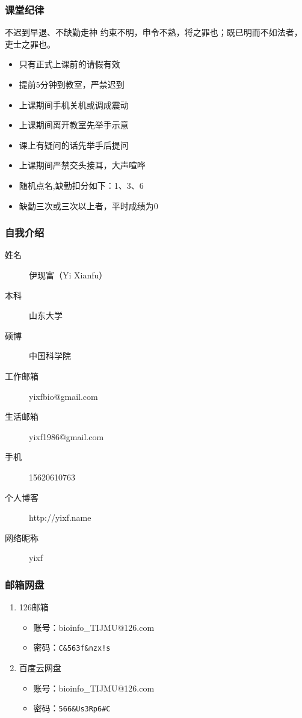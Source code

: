 



\begin{frame}
  \frametitle{课堂纪律}
  \begin{alertblock}{不迟到早退、不缺勤走神}
  约束不明，申令不熟，将之罪也；既已明而不如法者，吏士之罪也。
  \end{alertblock}
  \pause
  \begin{itemize}[<+->]
    \item 只有正式上课前的请假有效
    \item 提前5分钟到教室，严禁迟到
    \item 上课期间手机关机或调成震动
    \item 上课期间离开教室先举手示意
    \item 课上有疑问的话先举手后提问
    \item 上课期间严禁交头接耳，大声喧哗
    \item 随机点名,缺勤扣分如下：1、3、6
    \item 缺勤三次或三次以上者，平时成绩为0
  \end{itemize}
\end{frame}

\begin{frame}
  \frametitle{自我介绍}
    \begin{description}
      \item[姓\qquad 名]伊现富（Yi Xianfu）
      \item[本\qquad 科]山东大学
      \item[硕\qquad 博]中国科学院
      \item[工作邮箱]\alert{yixfbio@gmail.com}
      \item[生活邮箱]yixf1986@gmail.com
      \item[手\qquad 机]\alert{15620610763}
      \item[个人博客]\alert{http://yixf.name}
      \item[网络昵称]yixf
    \end{description}
\end{frame}

\begin{frame}
  \frametitle{邮箱网盘}
    \begin{enumerate}
      \item 126邮箱
        \begin{itemize}
          \item 账号：bioinfo\_TIJMU@126.com
          \item 密码：\texttt{C\&563f\&nzx!s}
        \end{itemize}
      \item \alert{百度云网盘}
        \begin{itemize}
	  \item \alert{账号：bioinfo\_TIJMU@126.com}
	  \item \alert{密码：\texttt{566\&Us3Rp6\#C}}
        \end{itemize}
    \end{enumerate}
\end{frame}

